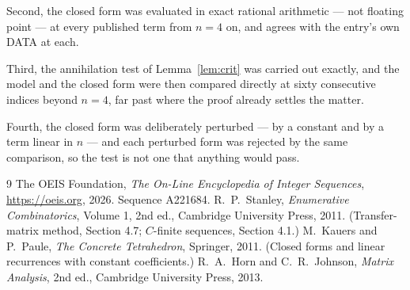 \documentclass[11pt,a4paper]{article}
\theoremstyle{plain}
\theoremstyle{definition}
\begin{document}
Second, the closed form was evaluated in exact rational arithmetic --- not floating point ---
at every published term from $n=4$ on, and agrees with the entry's own DATA at each.

Third, the annihilation test of Lemma~\ref{lem:crit} was carried out exactly, and the model
and the closed form were then compared directly at sixty consecutive indices beyond
$n=4$, far past where the proof already settles the matter.

Fourth, the closed form was deliberately perturbed --- by a constant and by a term linear in
$n$ --- and each perturbed form was rejected by the same comparison, so the test is not one
that anything would pass.

\begin{thebibliography}{9}
 The OEIS Foundation, \emph{The On-Line Encyclopedia of Integer
Sequences}, \url{https://oeis.org}, 2026. Sequence A221684.
 R.~P.~Stanley, \emph{Enumerative Combinatorics}, Volume 1, 2nd ed.,
Cambridge University Press, 2011. (Transfer-matrix method, Section 4.7; $C$-finite sequences,
Section 4.1.)
 M.~Kauers and P.~Paule, \emph{The Concrete Tetrahedron}, Springer, 2011.
(Closed forms and linear recurrences with constant coefficients.)
 R.~A.~Horn and C.~R.~Johnson, \emph{Matrix Analysis}, 2nd ed., Cambridge
University Press, 2013.
\end{thebibliography}
\end{document}
